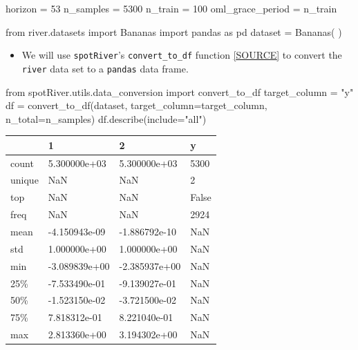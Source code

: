 \documentclass[
  letterpaper,
  DIV=11,
  numbers=noendperiod]{scrreprt}
\newenvironment{Shaded}{\begin{snugshade}}{\end{snugshade}}
\newcommand{\DecValTok}[1]{\textcolor[rgb]{0.68,0.00,0.00}{#1}}
\newcommand{\ImportTok}[1]{\textcolor[rgb]{0.00,0.46,0.62}{#1}}
\newcommand{\NormalTok}[1]{\textcolor[rgb]{0.00,0.23,0.31}{#1}}
\newcommand{\OperatorTok}[1]{\textcolor[rgb]{0.37,0.37,0.37}{#1}}
\newcommand{\StringTok}[1]{\textcolor[rgb]{0.13,0.47,0.30}{#1}}
\providecommand{\tightlist}{%
  \setlength{\itemsep}{0pt}\setlength{\parskip}{0pt}}\usepackage{longtable,booktabs,array}
\begin{document}
\begin{Shaded}
\begin{Highlighting}[]
\NormalTok{horizon }\OperatorTok{=} \DecValTok{53}
\NormalTok{n\_samples }\OperatorTok{=} \DecValTok{5300}
\NormalTok{n\_train }\OperatorTok{=} \DecValTok{100}
\NormalTok{oml\_grace\_period }\OperatorTok{=}\NormalTok{ n\_train}
\end{Highlighting}
\end{Shaded}

\begin{Shaded}
\begin{Highlighting}[]
\ImportTok{from}\NormalTok{ river.datasets }\ImportTok{import}\NormalTok{ Bananas}
\ImportTok{import}\NormalTok{ pandas }\ImportTok{as}\NormalTok{ pd}
\NormalTok{dataset }\OperatorTok{=}\NormalTok{ Bananas(}
\NormalTok{)}
\end{Highlighting}
\end{Shaded}

\begin{itemize}
\tightlist
\item
  We will use \texttt{spotRiver}'s \texttt{convert\_to\_df} function
  \href{https://github.com/sequential-parameter-optimization/spotRiver/blob/main/src/spotRiver/utils/data_conversion.py}{{[}SOURCE{]}}
  to convert the \texttt{river} data set to a \texttt{pandas} data
  frame.
\end{itemize}

\begin{Shaded}
\begin{Highlighting}[]
\ImportTok{from}\NormalTok{ spotRiver.utils.data\_conversion }\ImportTok{import}\NormalTok{ convert\_to\_df}
\NormalTok{target\_column }\OperatorTok{=} \StringTok{"y"}
\NormalTok{df }\OperatorTok{=}\NormalTok{ convert\_to\_df(dataset, target\_column}\OperatorTok{=}\NormalTok{target\_column, n\_total}\OperatorTok{=}\NormalTok{n\_samples)}
\NormalTok{df.describe(include}\OperatorTok{=}\StringTok{"all"}\NormalTok{)}
\end{Highlighting}
\end{Shaded}

\begin{longtable}[]{@{}llll@{}}
\toprule\noalign{}
& 1 & 2 & y \\
\midrule\noalign{}
\endhead
\bottomrule\noalign{}
\endlastfoot
count & 5.300000e+03 & 5.300000e+03 & 5300 \\
unique & NaN & NaN & 2 \\
top & NaN & NaN & False \\
freq & NaN & NaN & 2924 \\
mean & -4.150943e-09 & -1.886792e-10 & NaN \\
std & 1.000000e+00 & 1.000000e+00 & NaN \\
min & -3.089839e+00 & -2.385937e+00 & NaN \\
25\% & -7.533490e-01 & -9.139027e-01 & NaN \\
50\% & -1.523150e-02 & -3.721500e-02 & NaN \\
75\% & 7.818312e-01 & 8.221040e-01 & NaN \\
max & 2.813360e+00 & 3.194302e+00 & NaN \\
\end{longtable}
\end{document}
